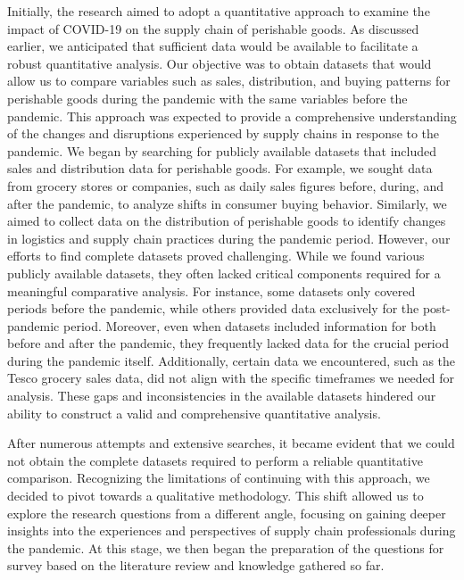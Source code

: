 Initially, the research aimed to adopt a quantitative approach to examine the impact of COVID-19 on the supply chain of perishable goods. As discussed earlier, we anticipated that sufficient data would be available to facilitate a robust quantitative analysis. Our objective was to obtain datasets that would allow us to compare variables such as sales, distribution, and buying patterns for perishable goods during the pandemic with the same variables before the pandemic. This approach was expected to provide a comprehensive understanding of the changes and disruptions experienced by supply chains in response to the pandemic. We began by searching for publicly available datasets that included sales and distribution data for perishable goods. For example, we sought data from grocery stores or companies, such as daily sales figures before, during, and after the pandemic, to analyze shifts in consumer buying behavior. Similarly, we aimed to collect data on the distribution of perishable goods to identify changes in logistics and supply chain practices during the pandemic period. However, our efforts to find complete datasets proved challenging. While we found various publicly available datasets, they often lacked critical components required for a meaningful comparative analysis. For instance, some datasets only covered periods before the pandemic, while others provided data exclusively for the post-pandemic period. Moreover, even when datasets included information for both before and after the pandemic, they frequently lacked data for the crucial period during the pandemic itself. Additionally, certain data we encountered, such as the Tesco grocery sales data, did not align with the specific timeframes we needed for analysis. These gaps and inconsistencies in the available datasets hindered our ability to construct a valid and comprehensive quantitative analysis.

After numerous attempts and extensive searches, it became evident that we could not obtain the complete datasets required to perform a reliable quantitative comparison. Recognizing the limitations of continuing with this approach, we decided to pivot towards a qualitative methodology. This shift allowed us to explore the research questions from a different angle, focusing on gaining deeper insights into the experiences and perspectives of supply chain professionals during the pandemic. At this stage, we then began the preparation of the questions for survey based on the literature review and knowledge gathered so far.


